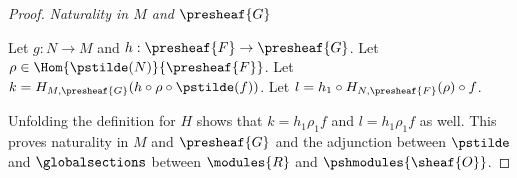 \begin{proof}
\textit{Naturality in $M$ and $\presheaf{G}$}

Let $g:N\rightarrow M$ and $h:\presheaf{F} \rightarrow \presheaf{G}$.
Let $\rho \in \Hom{\pstilde(N)}{\presheaf{F}}$.
Let $k = H_{M,\presheaf{G}} (h \circ \rho \circ \pstilde(f))$.
Let $l = h_1 \circ H_{N,\presheaf{F}}(\rho) \circ f$.

Unfolding the definition for $H$ shows that $k = h_1\rho_1 f$
and $l = h_1\rho_1 f$ as well.
This proves naturality in $M$ and $\presheaf{G}$ 
and the adjunction between $\pstilde$ and $\globalsections$
between $\modules{R}$ and $\pshmodules{\sheaf{O}}$.
\end{proof}
